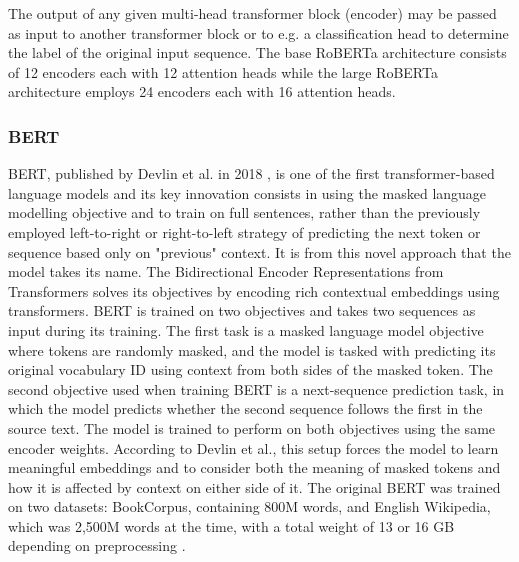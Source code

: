 \documentclass[12pt]{report}
\begin{document}
The output of any given multi-head transformer block (encoder) may be passed as input to another transformer block or to e.g. a classification head to determine the label of the original input sequence.
The base RoBERTa architecture consists of 12 encoders each with 12 attention heads while the large RoBERTa architecture employs 24 encoders each with 16 attention heads.

\subsubsection*{BERT}
BERT, published by Devlin et al. in 2018 \cite{BERT}, is one of the first transformer-based language models and its key innovation consists in using the masked language modelling objective and to train on full sentences, rather than the previously employed left-to-right or right-to-left strategy of predicting the next token or sequence based only on "previous" context.
It is from this novel approach that the model takes its name. The Bidirectional Encoder Representations from Transformers solves its objectives by encoding rich contextual embeddings using transformers.
BERT is trained on two objectives and takes two sequences as input during its training.
The first task is a masked language model objective where tokens are randomly masked, and the model is tasked with predicting its original vocabulary ID using context from both sides of the masked token. 
The second objective used when training BERT is a next-sequence prediction task, in which the model predicts whether the second sequence follows the first in the source text.
The model is trained to perform on both objectives using the same encoder weights.
According to Devlin et al., this setup forces the model to learn meaningful embeddings and to consider both the meaning of masked tokens and how it is affected by context on either side of it.
The original BERT was trained on two datasets: BookCorpus, containing 800M words, and English Wikipedia, which was 2,500M words at the time, with a total weight of 13 or 16 GB depending on preprocessing \cite{BERT, roberta}.
\end{document}
